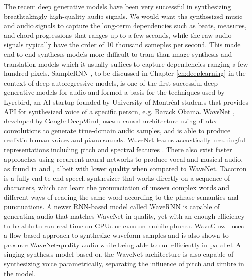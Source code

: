 The recent deep generative models have been very successful in synthesizing breathtakingly high-quality audio signals.
We would want the synthesized music and audio signals to capture the long-term dependencies such as beats, measures, and chord progressions that ranges up to a few seconds, while the raw audio signals typically have the order of 10 thousand sameples per second.
This made end-to-end synthesis models more difficult to train than image synthesis and translation models which it usually suffices to capture dependencies ranging a few hundred pixels.
SampleRNN \cite{mehri2016samplernn}, to be discussed in Chapter \ref{ch:deeplearning} in the context of deep autoregressive models, is one of the first successful deep generative models for audio and formed a basis for the techniques used by Lyrebird, an AI startup founded by University of Montr\'{e}al students that provides API for synthesized voice of a specific person, e.g. Barack Obama.
WaveNet \cite{oord2016wavenet}, developed by Google DeepMind, uses a causal architecture using dilated convolutions to generate time-domain audio samples, and is able to produce realistic human voices and piano sounds.
WaveNet learns acoustically meaningful representations including pitch and spectral features \cite{hua2018wavenet}.
There also exist faster approaches using recurrent neural networks to produce vocal and musical audio, as found in \cite{nayebi2015gruv} and \cite{kalingeri2016generation}, albeit with lower quality when compared to WaveNet.
Tacotron \cite{wang2017tacotron, shen2018tacotron} is a fully end-to-end speech synthesizer that works directly on a sequence of characters, which can learn the pronunciation of unseen complex words and different ways of reading the same word according to the phrase semantics and punctuations.
A newer RNN-based model called WaveRNN \cite{kalchbrenner2018wavernn} is capable of generating audio that matches WaveNet in quality, yet with an enough efficiency to be able to run real-time on GPUs or even on mobile phones.
WaveGlow~\cite{prenger2019waveglow} uses a flow-based approach to synthesize waveform samples and is also shown to produce WaveNet-quality audio while being able to run efficiently in parallel.
A singing synthesis model \cite{blaauw2017singing} based on the WaveNet architecture is also capable of synthesizing voice parametrically, separating the influence of pitch and timbre in the model.

